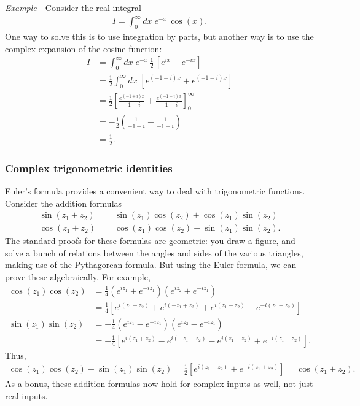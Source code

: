 \documentclass[10pt,a4paper]{article}
\begin{document}
\begin{framed}\noindent
  \textit{Example}---Consider the real integral
  \begin{align}
    I = \int_0^\infty dx \; e^{- x} \, \cos(x).
  \end{align}
  One way to solve this is to use integration by parts, but another
  way is to use the complex expansion of the cosine function:
  \begin{align}
    I &= \int_0^\infty dx \; e^{- x} \,\frac{1}{2}\, \left[e^{ix} + e^{-ix}\right] \\ &= \frac{1}{2} \int_0^\infty dx \; \left[e^{(-1+i)x} + e^{(-1-i)x}\right] \\ &= \frac{1}{2} \left[ \frac{e^{(-1+i) x}}{-1+i} + \frac{e^{(-1 - i) x}}{-1 - i}\right]_0^\infty \\ &= -\frac{1}{2} \left(\frac{1}{-1+i} + \frac{1}{-1 - i}\right) \\ &= \frac{1}{2}.
  \end{align}
\end{framed}

\subsubsection{Complex trigonometric identities}

Euler's formula provides a convenient way to deal with trigonometric
functions.  Consider the addition formulas
\begin{align}
  \sin(z_1 + z_2) &= \sin(z_1) \cos(z_2) + \cos(z_1)\sin(z_2) \\
  \cos(z_1 + z_2) &= \cos(z_1) \cos(z_2) - \sin(z_1)\sin(z_2).
\end{align}
The standard proofs for these formulas are geometric: you draw a
figure, and solve a bunch of relations between the angles and sides of
the various triangles, making use of the Pythagorean formula. But
using the Euler formula, we can prove these algebraically.  For
example,
\begin{align}
  \cos(z_1)\cos(z_2) &= \frac{1}{4}\left(e^{iz_1} + e^{-iz_1}\right) \left(e^{iz_2} + e^{-iz_1}\right)\\
  &= \frac{1}{4}\left[e^{i(z_1+z_2)} + e^{i(-z_1 + z_2)} + e^{i(z_1 -z_2)} + e^{-i(z_1+z_2)}\right] \\
  \sin(z_1)\sin(z_2) &= -\frac{1}{4}\left(e^{iz_1} - e^{-iz_1}\right) \left(e^{iz_2} - e^{-iz_1}\right) \\
  &= -\frac{1}{4}\left[e^{i(z_1+z_2)} - e^{i(-z_1 + z_2)} - e^{i(z_1 -z_2)} + e^{-i(z_1+z_2)}\right].
\end{align}
Thus,
\begin{align}
  \cos(z_1) \cos(z_2) - \sin(z_1)\sin(z_2) = \frac{1}{2}\left[e^{i(z_1+z_2)} + e^{-i(z_1+z_2)}\right] = \cos(z_1 + z_2).
\end{align}
As a bonus, these addition formulas now hold for complex inputs as
well, not just real inputs.
\end{document}
